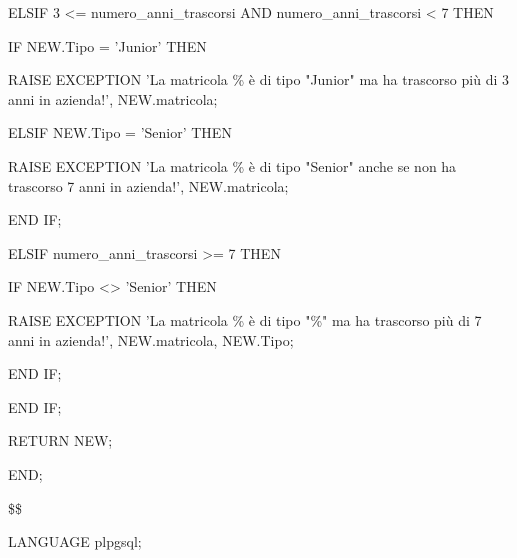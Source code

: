 \begin{flushleft}
\begin{description}
\begin{description}
                            \item ELSIF 3 <= numero\_anni\_trascorsi AND numero\_anni\_trascorsi < 7 THEN
                            \begin{description}
                                \item IF NEW.Tipo = 'Junior' THEN
                                \begin{description}
                                    \item RAISE EXCEPTION 'La matricola \% è di tipo "Junior" ma ha trascorso più di 3 anni in azienda!', NEW.matricola;
                                \end{description}
                                \item ELSIF NEW.Tipo = 'Senior' THEN
                                \begin{description}
                                    \item RAISE EXCEPTION 'La matricola \% è di tipo "Senior" anche se non ha trascorso 7 anni in azienda!', NEW.matricola;
                                \end{description}
                                \item END IF;
                            \end{description}
                            
                            \item ELSIF numero\_anni\_trascorsi >= 7 THEN
                            \begin{description}
                                \item IF NEW.Tipo <> 'Senior' THEN
                                \begin{description}
                                    \item RAISE EXCEPTION 'La matricola \% è di tipo "\%" ma ha trascorso più di 7 anni in azienda!', NEW.matricola, NEW.Tipo;  
                                \end{description}  
                                \item END IF;
                            \end{description}
            
                            \item END IF;
                            \item RETURN NEW;
                    \end{description}
                    \item END;
                    \item \$\$
                    \item LANGUAGE plpgsql;
                \end{description}
            \end{flushleft}
        \normalfont

